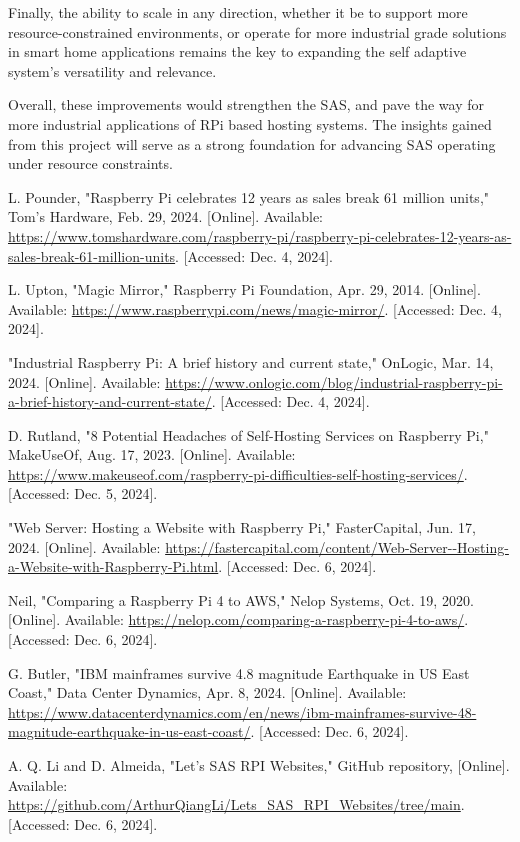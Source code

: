\documentclass[conference]{IEEEtran}
\begin{document}
Finally, the ability to scale in any direction, whether it be to support more resource-constrained environments, or operate for more industrial grade solutions in smart home applications remains the key to expanding the self adaptive system's versatility and relevance.

Overall, these improvements would strengthen the SAS, and pave the way for more industrial applications of RPi based hosting systems. The insights gained from this project will serve as a strong foundation for advancing SAS operating under resource constraints.

\begin{thebibliography}{00}

     L. Pounder, "Raspberry Pi celebrates 12 years as sales break 61 million units," Tom's Hardware, Feb. 29, 2024. [Online]. Available: \url{https://www.tomshardware.com/raspberry-pi/raspberry-pi-celebrates-12-years-as-sales-break-61-million-units}. [Accessed: Dec. 4, 2024].

     L. Upton, "Magic Mirror," Raspberry Pi Foundation, Apr. 29, 2014. [Online]. Available: \url{https://www.raspberrypi.com/news/magic-mirror/}. [Accessed: Dec. 4, 2024].

     "Industrial Raspberry Pi: A brief history and current state," OnLogic, Mar. 14, 2024. [Online]. Available: \url{https://www.onlogic.com/blog/industrial-raspberry-pi-a-brief-history-and-current-state/}. [Accessed: Dec. 4, 2024].

     D. Rutland, "8 Potential Headaches of Self-Hosting Services on Raspberry Pi," MakeUseOf, Aug. 17, 2023. [Online]. Available: \url{https://www.makeuseof.com/raspberry-pi-difficulties-self-hosting-services/}. [Accessed: Dec. 5, 2024].

     "Web Server: Hosting a Website with Raspberry Pi," FasterCapital, Jun. 17, 2024. [Online]. Available: \url{https://fastercapital.com/content/Web-Server--Hosting-a-Website-with-Raspberry-Pi.html}. [Accessed: Dec. 6, 2024].

     Neil, "Comparing a Raspberry Pi 4 to AWS," Nelop Systems, Oct. 19, 2020. [Online]. Available: \url{https://nelop.com/comparing-a-raspberry-pi-4-to-aws/}. [Accessed: Dec. 6, 2024].

     G. Butler, "IBM mainframes survive 4.8 magnitude Earthquake in US East Coast," Data Center Dynamics, Apr. 8, 2024. [Online]. Available: \url{https://www.datacenterdynamics.com/en/news/ibm-mainframes-survive-48-magnitude-earthquake-in-us-east-coast/}. [Accessed: Dec. 6, 2024].

     A. Q. Li and D. Almeida, "Let's SAS RPI Websites," GitHub repository, [Online]. Available: \url{https://github.com/ArthurQiangLi/Lets_SAS_RPI_Websites/tree/main}. [Accessed: Dec. 6, 2024].

\end{thebibliography}
\end{document}

